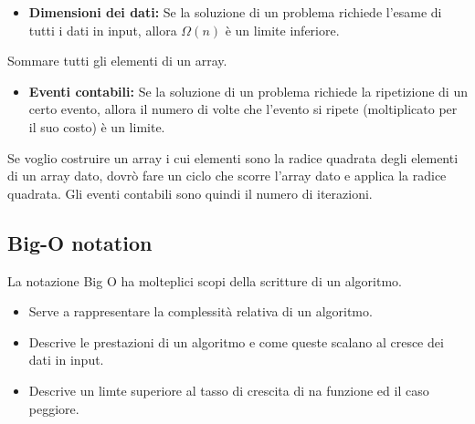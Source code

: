 \begin{itemize}
    \item \textbf{Dimensioni dei dati:} Se la soluzione di un problema richiede l'esame di tutti i dati in input, allora $\Omega(n)$ è un limite inferiore.
\end{itemize}
\begin{example}
    Sommare tutti gli elementi di un array.
\end{example}
\begin{itemize}
    \item \textbf{Eventi contabili:} Se la soluzione di un problema richiede la ripetizione di un certo evento, allora il numero di volte che l'evento si ripete (moltiplicato per il suo costo) è un limite.
\end{itemize}
\begin{example}
    Se voglio costruire un array i cui elementi sono la radice quadrata degli elementi di un array dato, dovrò fare un ciclo che scorre l'array dato e applica la radice quadrata. Gli eventi contabili sono quindi il numero di iterazioni.
\end{example}

\subsection{Big-O notation}
La notazione Big O ha molteplici scopi della scritture di un algoritmo.
\begin{itemize}
    \item Serve a rappresentare la complessità relativa di un algoritmo.
    \item Descrive le prestazioni di un algoritmo e come queste scalano al cresce dei dati in input.
    \item Descrive un limte superiore al tasso di crescita di na funzione ed il caso peggiore.
\end{itemize}

